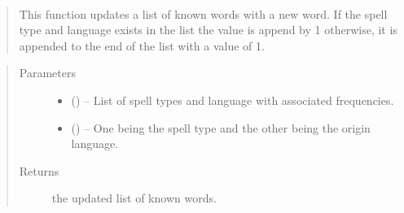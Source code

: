 \documentclass[letterpaper,10pt,english]{sphinxmanual}
\begin{document}
\begin{fulllineitems}
\label{code:hp_spells.checkStoredWords}~\begin{quote}

This function updates a list of known words with a new word. If the spell type and language exists in the list the value is append by 1 otherwise, it is appended to the end of the list with a value of 1.
\end{quote}
\begin{quote}\begin{description}
\item[{Parameters}] \leavevmode\begin{itemize}
\item {} 
 (\sphinxstyleliteralemphasis{}\sphinxstyleliteralemphasis{{[}}\sphinxstyleliteralemphasis{}\sphinxstyleliteralemphasis{{[}}\sphinxstyleliteralemphasis{}\sphinxstyleliteralemphasis{{[}}\sphinxstyleliteralemphasis{, }\sphinxstyleliteralemphasis{{]}}\sphinxstyleliteralemphasis{}\sphinxstyleliteralemphasis{, }\sphinxstyleliteralemphasis{{]}}\sphinxstyleliteralemphasis{{]}}\sphinxstyleliteralemphasis{}) -- List of spell types and language with associated frequencies.

\item {} 
 () -- One being the spell type and the other being the origin language.

\end{itemize}

\item[{Returns}] \leavevmode
the updated list of known words.

\end{description}\end{quote}

\end{fulllineitems}

\end{document}
